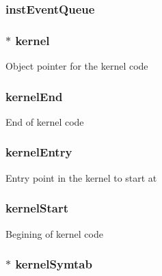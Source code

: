 \label{classSystem_aebfcbf904f5dc098c119f45063661dce}
\hypertarget{classSystem_a05694f19dc768ad2378b58790c870f61}{
\subsubsection[{instEventQueue}]{ {\bf instEventQueue}}}
\label{classSystem_a05694f19dc768ad2378b58790c870f61}
\hypertarget{classSystem_ab5c2cc90b7ed9b57e9d9c6ce42a5200b}{
\subsubsection[{kernel}]{$\ast$ {\bf kernel}}}
\label{classSystem_ab5c2cc90b7ed9b57e9d9c6ce42a5200b}
Object pointer for the kernel code \hypertarget{classSystem_ab50e277f319055cb4e9d05e09e314b4a}{
\subsubsection[{kernelEnd}]{ {\bf kernelEnd}}}
\label{classSystem_ab50e277f319055cb4e9d05e09e314b4a}
End of kernel code \hypertarget{classSystem_aa4fb57a8e8cf6890a99606f31841c74f}{
\subsubsection[{kernelEntry}]{ {\bf kernelEntry}}}
\label{classSystem_aa4fb57a8e8cf6890a99606f31841c74f}
Entry point in the kernel to start at \hypertarget{classSystem_ab7de1b59ae9f13ebe06ee0fdaf262505}{
\subsubsection[{kernelStart}]{ {\bf kernelStart}}}
\label{classSystem_ab7de1b59ae9f13ebe06ee0fdaf262505}
Begining of kernel code \hypertarget{classSystem_a579bef006c1d6148c2764355c0b039b7}{
\subsubsection[{kernelSymtab}]{$\ast$ {\bf kernelSymtab}}}
